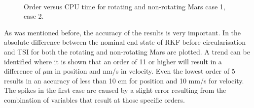 \begin{figure}[H]
\centering
{} \\
\caption{Order versus CPU time for rotating and non-rotating Mars \protect{} case 1,  \protect{} case 2. } 
\label{fig:orderVsCPUcase1combined} 
\end{figure} 

\noindent
As was mentioned before, the accuracy of  the results is very important. In  the absolute difference between the nominal end state of \ac{RKF} before circularisation and \ac{TSI} for both the rotating and non-rotating Mars are plotted. A trend can be identified where it is shown that an order of 11 or higher will result in a difference of $\mu$m in position and nm/s in velocity. Even the lowest order of 5 results in an accuracy of less than 10 cm for position and 10 mm/s for velocity. The spikes in the first case are caused by a slight error resulting from the combination of variables that result at those specific orders.

